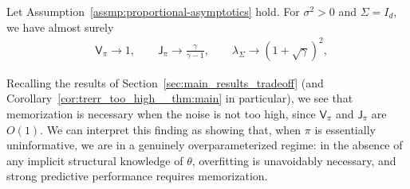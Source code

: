 \documentclass[11pt]{article}
\newcommand{\bysest}{\what{\theta}_{\mathsf{B}}}
\newcommand{\trerr}{\mathsf{Train}}
\newcommand{\jfunc}{\mathsf{J}}
\begin{document}
\begin{proposition} \label{prop:applications-isotropic} Let Assumption~\ref{assmp:proportional-asymptotics} hold. For $\sigma^2 > 0$ and $\Sigma = I_d$, we have almost surely
\begin{align*}
    &\mathsf{V}_{\pi} \to 1, \qquad \jfunc_{\pi} \to \frac{\gamma}{\gamma - 1}, \qquad \lambda_{\Sigma} \to (1 + \sqrt{\gamma})^2,
\end{align*}
\end{proposition}

Recalling the results of Section~\ref{sec:main_results_tradeoff} (and Corollary~\ref{cor:trerr_too_high__thm:main} in particular), we see that memorization is necessary when the noise is not too high, since $\mathsf{V}_{\pi}$ and $\jfunc_\pi$ are $O(1)$. We can interpret this finding as showing that, when $\pi$ is essentially uninformative, we are in a genuinely overparameterized regime: in the absence of any implicit structural knowledge of $\theta$, overfitting is unavoidably necessary, and strong predictive performance requires memorization.
\end{document}

